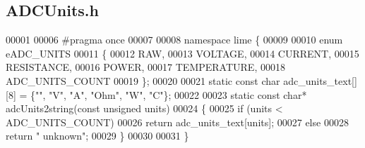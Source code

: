 \subsection{A\+D\+C\+Units.\+h}
\label{ADCUnits_8h_source}

\begin{DoxyCode}
00001 
00006 \textcolor{preprocessor}{#pragma once}
00007 
00008 \textcolor{keyword}{namespace }lime \{
00009 
00010 \textcolor{keyword}{enum} eADC_UNITS
00011 \{
00012     RAW,
00013     VOLTAGE,
00014     CURRENT,
00015     RESISTANCE,
00016     POWER,
00017     TEMPERATURE,
00018     ADC_UNITS_COUNT
00019 \};
00020 
00021 \textcolor{keyword}{static} \textcolor{keyword}{const} \textcolor{keywordtype}{char}  adc_units_text[][8] = \{\textcolor{stringliteral}{""}, \textcolor{stringliteral}{"V"}, \textcolor{stringliteral}{"A"}, \textcolor{stringliteral}{"Ohm"}, \textcolor{stringliteral}{"W"}, \textcolor{stringliteral}{"C"}\};
00022 
00023 \textcolor{keyword}{static} \textcolor{keyword}{const} \textcolor{keywordtype}{char}* adcUnits2string(\textcolor{keyword}{const} \textcolor{keywordtype}{unsigned} units)
00024 \{
00025     \textcolor{keywordflow}{if} (units < ADC_UNITS_COUNT)
00026         \textcolor{keywordflow}{return} adc\_units\_text[units];
00027     \textcolor{keywordflow}{else}
00028         \textcolor{keywordflow}{return} \textcolor{stringliteral}{" unknown"};
00029 \}
00030 
00031 \}
\end{DoxyCode}
